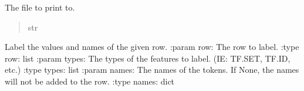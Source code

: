 \documentclass[letterpaper,10pt,english]{sphinxmanual}
\begin{document}
\begin{fulllineitems}
\begin{fulllineitems}
\begin{quote}
\begin{description}
\end{description}\end{quote}

\end{fulllineitems}


\begin{fulllineitems}
\label{\detokenize{nodes:nodes.nodePrinter.nodePrinter.log_file}}
\pysigstartsignatures
\pysigline
{}
\pysigstopsignatures
\sphinxAtStartPar
The file to print to.
\begin{quote}\begin{description}
\sphinxAtStartPar
str

\end{description}\end{quote}

\end{fulllineitems}


\begin{fulllineitems}
\label{\detokenize{nodes:nodes.nodePrinter.nodePrinter.label_values}}
\pysigstartsignatures
\pysiglinewithargsret
{}
{\sphinxparamcomma {}\sphinxparamcomma {}}
{}
\pysigstopsignatures
\sphinxAtStartPar
Label the values and names of the given row.
:param row: The row to label.
:type row: list
:param types: The types of the features to label. (IE: TF.SET, TF.ID, etc.)
:type types: list
:param names: The names of the tokens. If None, the names will not be added to the row.
:type names: dict

\end{fulllineitems}



\end{fulllineitems}
\end{document}
